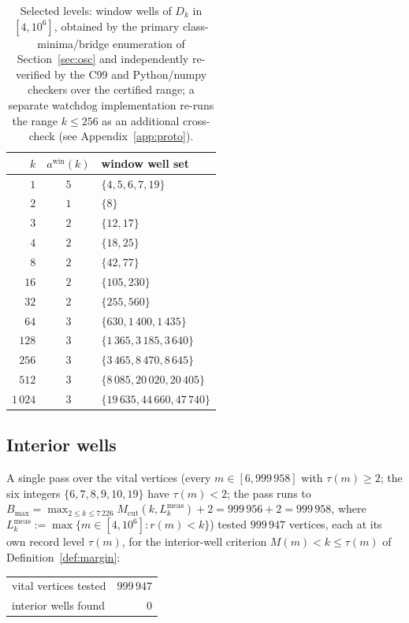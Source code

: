 \documentclass[11pt]{article}
\theoremstyle{plain}
\theoremstyle{definition}
\newcommand{\rch}{r}
\newcommand{\Dk}{D_{k}}
\newcommand{\Mcut}{M_{\mathrm{cut}}}
\begin{document}
\begin{table}[htbp]
\centering
\caption{Selected levels: window wells of $\Dk$ in $[4,10^{6}]$,
obtained by the primary class-minima/bridge enumeration of
Section~\ref{sec:osc} and independently re-verified by the
C99 and Python/numpy checkers over the certified range; a
separate watchdog implementation re-runs the range $k \le 256$ as
an additional cross-check (see Appendix~\ref{app:proto}).}
\label{tab:chk1m}
\begin{tabular}{@{}rcl@{}}
\toprule
$k$ & $a^{\mathrm{win}}(k)$ & window well set\\
\midrule
$1$ & $5$ & $\{4, 5, 6, 7, 19\}$\\
$2$ & $1$ & $\{8\}$\\
$3$ & $2$ & $\{12, 17\}$\\
$4$ & $2$ & $\{18, 25\}$\\
$8$ & $2$ & $\{42, 77\}$\\
$16$ & $2$ & $\{105, 230\}$\\
$32$ & $2$ & $\{255, 560\}$\\
$64$ & $3$ & $\{630, 1\,400, 1\,435\}$\\
$128$ & $3$ & $\{1\,365, 3\,185, 3\,640\}$\\
$256$ & $3$ & $\{3\,465, 8\,470, 8\,645\}$\\
$512$ & $3$ & $\{8\,085, 20\,020, 20\,405\}$\\
$1\,024$ & $3$ & $\{19\,635, 44\,660, 47\,740\}$\\
\bottomrule
\end{tabular}
\end{table}

\subsection{Interior wells}

A single pass over the vital vertices (every $m \in [6, 999\,958]$
with $\tau(m) \ge 2$; the six integers $\{6,7,8,9,10,19\}$
have $\tau(m) < 2$; the pass runs to
$B_{\max} = \max_{2 \le k \le 7\,226} \Mcut(k, L_k^{\mathrm{meas}}) + 2
= 999\,956 + 2 = 999\,958$, where
$L_k^{\mathrm{meas}} := \max\{m \in [4, 10^{6}] : \rch(m) < k\}$) tested
$999\,947$ vertices, each at its own record level $\tau(m)$, for the
interior-well criterion $M(m) < k \le \tau(m)$ of
Definition~\ref{def:margin}:

\begin{center}
\begin{tabular}{@{}lr@{}}
\toprule
vital vertices tested & $999\,947$\\
interior wells found & $0$\\
\bottomrule
\end{tabular}
\end{center}
\end{document}
